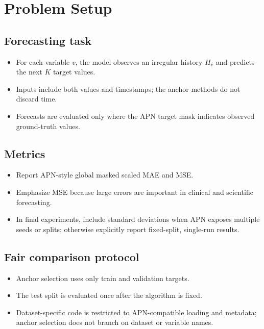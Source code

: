 \documentclass{article}
\begin{document}
\section{Problem Setup}

\subsection{Forecasting task}

\begin{itemize}
    \item For each variable $v$, the model observes an irregular history
    $H_v$ and predicts the next $K$ target values.
    \item Inputs include both values and timestamps; the anchor methods do not
    discard time.
    \item Forecasts are evaluated only where the APN target mask indicates
    observed ground-truth values.
\end{itemize}

\subsection{Metrics}

\begin{itemize}
    \item Report APN-style global masked scaled MAE and MSE.
    \item Emphasize MSE because large errors are important in clinical and
    scientific forecasting.
    \item In final experiments, include standard deviations when APN exposes
    multiple seeds or splits; otherwise explicitly report fixed-split,
    single-run results.
\end{itemize}

\subsection{Fair comparison protocol}

\begin{itemize}
    \item Anchor selection uses only train and validation targets.
    \item The test split is evaluated once after the algorithm is fixed.
    \item Dataset-specific code is restricted to APN-compatible loading and
    metadata; anchor selection does not branch on dataset or variable names.
\end{itemize}
\end{document}
